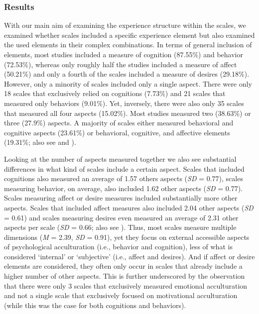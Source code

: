 \subsubsection{Results}

With our main aim of examining the experience structure within the
scales, we examined whether scales included a specific experience
element but also examined the used elements in their complex
combinations. In terms of general inclusion of elements, most studies
included a measure of cognition (87.55\%) and behavior (72.53\%),
whereas only roughly half the studies included a measure of affect
(50.21\%) and only a fourth of the scales included a measure of desires
(29.18\%). However, only a minority of scales included only a single
aspect. There were only 18 scales that exclusively relied on cognitions
(7.73\%) and 21 scales that measured only behaviors (9.01\%). Yet,
inversely, there were also only 35 scales that measured all four aspects
(15.02\%). Most studies measured two (38.63\%) or three (27.9\%)
aspects. A majority of scales either measured behavioral and cognitive
aspects (23.61\%) or behavioral, cognitive, and affective elements
(19.31\%; also see  and
).

Looking at the number of aspects measured together we also see
substantial differences in what kind of scales include a certain aspect.
Scales that included cognitions also measured an average of 1.57 others
aspects (\textit{SD} = 0.77), scales measuring behavior, on average,
also included 1.62 other aspects (\textit{SD} = 0.77). Scales measuring
affect or desire measures included substantially more other aspects.
Scales that included affect measures also included 2.04 other aspects
(\textit{SD} = 0.61) and scales measuring desires even measured an
average of 2.31 other aspects per scale (\textit{SD} = 0.66; also see
). Thus, most scales measure multiple
dimensions (\textit{M} = 2.39, \textit{SD} = 0.91), yet they focus on
external accessible aspects of psychological acculturation (i.e.,
behavior and cognition), less of what is considered `internal' or
`subjective' (i.e., affect and desires). And if affect or desire
elements are considered, they often only occur in scales that already
include a higher number of other aspects. This is further underscored by
the observation that there were only 3 scales that exclusively measured
emotional acculturation and not a single scale that exclusively focused
on motivational acculturation (while this was the case for both
cognitions and behaviors).

